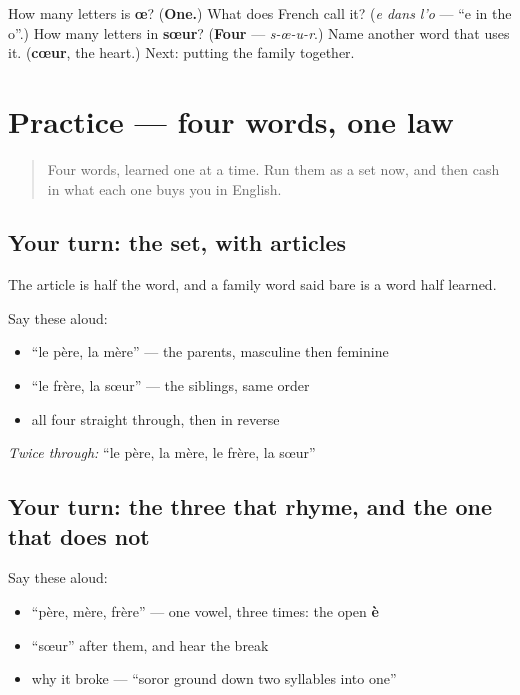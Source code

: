 \begin{tcolorbox}[breakable,colback=teal!4,colframe=teal!35!black,title={Before you move on}]
How many letters is \textbf{œ}? (\textbf{One.}) What does French call it? (\emph{e dans l'o} — \textquotedblleft{}e in the o\textquotedblright{}.) How many letters in \textbf{sœur}? (\textbf{Four} — \emph{s-œ-u-r}.) Name another word that uses it. (\textbf{cœur}, the heart.) Next: putting the family together.
\end{tcolorbox}
\section[Practice]{Practice — four words, one law}

\label{lesson:FR-C10-practice}



\begin{quote}
Four words, learned one at a time. Run them as a set now, and then cash in what each one buys you in English.
\end{quote}

\subsection*{Your turn: the set, with articles}
The article is half the word, and a family word said bare is a word half learned.

Say these aloud:

\begin{itemize}
\raggedright
  \item \textquotedblleft{}le père, la mère\textquotedblright{} — the parents, masculine then feminine
  \item \textquotedblleft{}le frère, la sœur\textquotedblright{} — the siblings, same order
  \item all four straight through, then in reverse
\end{itemize}

\emph{Twice through:} \textquotedblleft{}le père, la mère, le frère, la sœur\textquotedblright{}

\subsection*{Your turn: the three that rhyme, and the one that does not}
Say these aloud:

\begin{itemize}
\raggedright
  \item \textquotedblleft{}père, mère, frère\textquotedblright{} — one vowel, three times: the open \textbf{è}
  \item \textquotedblleft{}sœur\textquotedblright{} after them, and hear the break
  \item why it broke — \textquotedblleft{}soror ground down two syllables into one\textquotedblright{}
\end{itemize}

